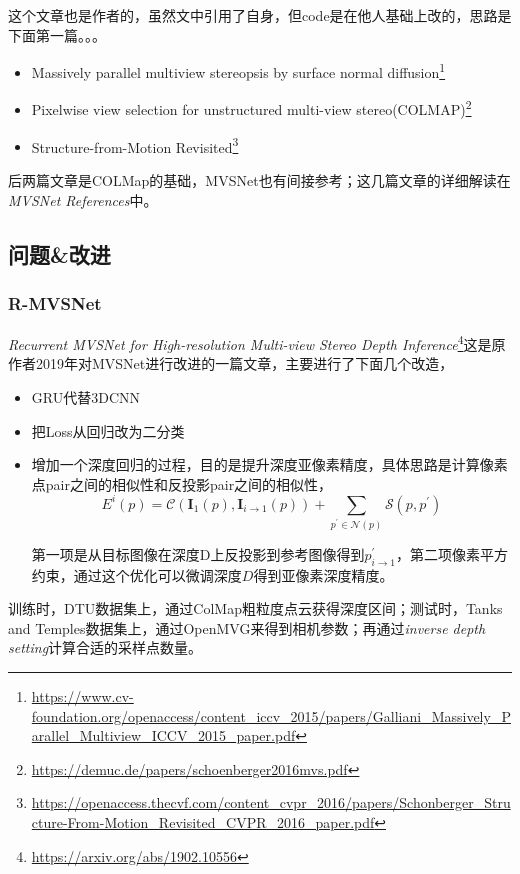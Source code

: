 	这个文章也是作者的，虽然文中引用了自身，但code是在他人基础上改的，思路是下面第一篇。。。

	\begin{itemize}
		\item  Massively parallel multiview stereopsis by surface normal diffusion\footnote{\url{https://www.cv-foundation.org/openaccess/content_iccv_2015/papers/Galliani_Massively_Parallel_Multiview_ICCV_2015_paper.pdf}}
		\item Pixelwise view selection for unstructured multi-view stereo(COLMAP)\footnote{\url{https://demuc.de/papers/schoenberger2016mvs.pdf}}
		\item Structure-from-Motion Revisited\footnote{\url{https://openaccess.thecvf.com/content_cvpr_2016/papers/Schonberger_Structure-From-Motion_Revisited_CVPR_2016_paper.pdf}}
	\end{itemize}

	后两篇文章是COLMap的基础，MVSNet也有间接参考；这几篇文章的详细解读在\textit{MVSNet References}中。

\subsection{问题\&改进}
	
	\subsubsection*{R-MVSNet}
		\textit{Recurrent MVSNet for High-resolution Multi-view Stereo Depth Inference}\footnote{\url{https://arxiv.org/abs/1902.10556}}这是原作者2019年对MVSNet进行改进的一篇文章，主要进行了下面几个改造，

		\begin{itemize}
			\item GRU代替3DCNN
			\item 把Loss从回归改为二分类
			\item 增加一个深度回归的过程，目的是提升深度亚像素精度，具体思路是计算像素点pair之间的相似性和反投影pair之间的相似性，
			$$
				E^i(p) =\mathcal{C}\left(\mathbf{I}_1(p),\mathbf{I}_{i\rightarrow1}(p)\right) + \sum_{p^\prime \in \mathcal{N}(p)}\mathcal{S}(p,p^\prime)
			$$

			第一项是从目标图像在深度D上反投影到参考图像得到$p^\prime_{i\rightarrow1}$，第二项像素平方约束，通过这个优化可以微调深度$D$得到亚像素深度精度。
		\end{itemize}
		
		训练时，DTU数据集上，通过ColMap粗粒度点云获得深度区间；测试时，Tanks and Temples数据集上，通过OpenMVG来得到相机参数；再通过\textit{inverse depth setting}计算合适的采样点数量。\\

